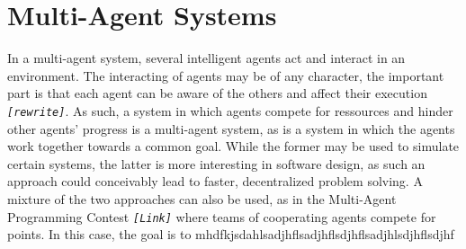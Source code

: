 
\section{Multi-Agent Systems}

In a multi-agent system, several intelligent agents act and interact
in an environment. The interacting of agents may be of any character,
the important part is that each agent can be aware of the others and
affect their execution \texttt{\emph{{[}rewrite{]}}}. As such, a system
in which agents compete for ressources and hinder other agents' progress
is a multi-agent system, as is a system in which the agents work together
towards a common goal. While the former may be used to simulate certain
systems, the latter is more interesting in software design, as such
an approach could conceivably lead to faster, decentralized problem
solving. A mixture of the two approaches can also be used, as in the
Multi-Agent Programming Contest \texttt{\emph{{[}Link{]}}} where teams
of cooperating agents compete for points. In this case, the goal is
to mhdfkjsdahlsadjhflsadjhflsdjhflsadjhlsdjhflsdjhf

